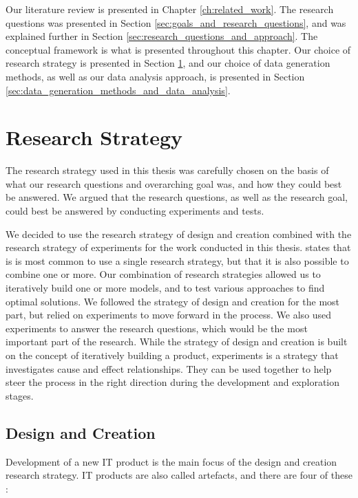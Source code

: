 Our literature review is presented in Chapter \ref{ch:related_work}. The research questions was presented in Section \ref{sec:goals_and_research_questions}, and was explained further in Section \ref{sec:research_questions_and_approach}. The conceptual framework is what is presented throughout this chapter. Our choice of research strategy is presented in Section \ref{sec:research_strategy}, and our choice of data generation methods, as well as our data analysis approach, is presented in Section \ref{sec:data_generation_methods_and_data_analysis}.


\section{Research Strategy}
\label{sec:research_strategy}
The research strategy used in this thesis was carefully chosen on the basis of what our research questions and overarching goal was, and how they could best be answered. We argued that the research questions, as well as the research goal, could best be answered by conducting experiments and tests. 

We decided to use the research strategy of design and creation combined with the research strategy of experiments for the work conducted in this thesis. \citep{oates2005researching} states that is is most common to use a single research strategy, but that it is also possible to combine one or more. Our combination of research strategies allowed us to iteratively build one or more models, and to test various approaches to find optimal solutions. We followed the strategy of design and creation for the most part, but relied on experiments to move forward in the process. We also used experiments to answer the research questions, which would be the most important part of the research. While the strategy of design and creation is built on the concept of iteratively building a product, experiments is a strategy that investigates cause and effect relationships. They can be used together to help steer the process in the right direction during the development and exploration stages.

\subsection{Design and Creation}
\label{sec:design_and_creation}
Development of a new IT product is the main focus of the design and creation research strategy. IT products are also called artefacts, and there are four of these \citep{march1995design, oates2005researching}:

